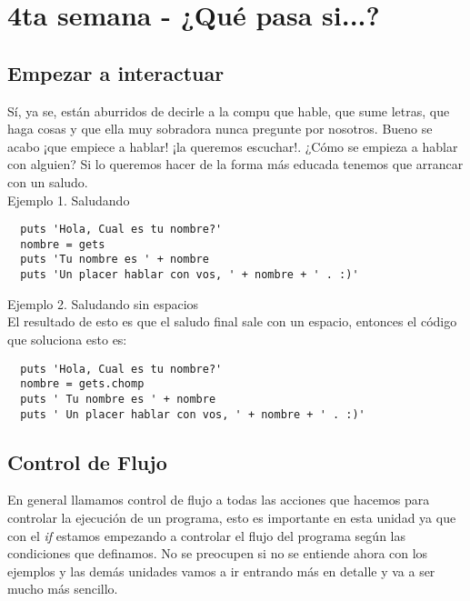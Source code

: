 \chapter{4ta semana - ¿Qué pasa si...?}

\section{Empezar a interactuar}
Sí, ya se, están aburridos de decirle a la compu que hable, que sume letras, que haga cosas y que ella muy sobradora nunca pregunte por nosotros. Bueno se acabo ¡que empiece a hablar! ¡la queremos escuchar!. ¿Cómo se empieza a hablar con alguien? Si lo queremos hacer de la forma más educada tenemos que arrancar con un saludo.\\

Ejemplo 1. Saludando
\begin{lstlisting}
  puts 'Hola, Cual es tu nombre?'
  nombre = gets
  puts 'Tu nombre es ' + nombre
  puts 'Un placer hablar con vos, ' + nombre + ' . :)'
\end{lstlisting}

Ejemplo 2. Saludando sin espacios\\

El resultado de esto es que el saludo final sale con un espacio, entonces el código que soluciona esto es:

\begin{lstlisting}
  puts 'Hola, Cual es tu nombre?'
  nombre = gets.chomp
  puts ' Tu nombre es ' + nombre
  puts ' Un placer hablar con vos, ' + nombre + ' . :)'
\end{lstlisting}

\section{Control de Flujo}
En general llamamos control de flujo a todas las acciones que hacemos para controlar la ejecución de un programa, esto es importante en esta unidad ya que con el \emph{if} estamos empezando a controlar el flujo del programa según las condiciones que definamos. No se preocupen si no se entiende ahora con los ejemplos y las demás unidades vamos a ir entrando más en detalle y va a ser mucho más sencillo.

